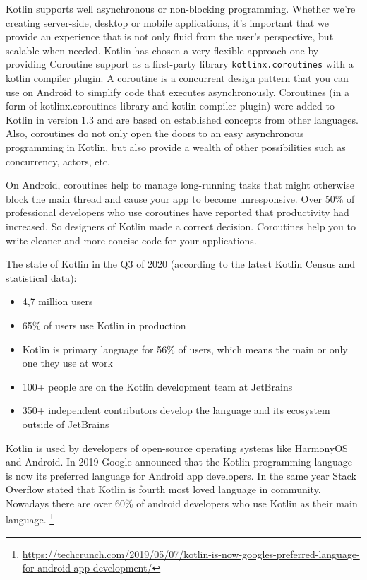 Kotlin supports well asynchronous or non-blocking programming. Whether we're creating server-side, desktop or mobile applications, it's important that we provide an experience that is not only fluid from the user's perspective, but scalable when needed. Kotlin has chosen a very flexible approach one by providing Coroutine support as a first-party library  \texttt{kotlinx.coroutines} with a kotlin compiler plugin. A coroutine is a concurrent design pattern that you can use on Android to simplify code that executes asynchronously. Coroutines (in a form of kotlinx.coroutines library and kotlin compiler plugin) were added to Kotlin in version 1.3 and are based on established concepts from other languages. Also, coroutines do not only open the doors to an easy asynchronous programming in Kotlin, but also provide a wealth of other possibilities such as concurrency, actors, etc.

On Android, coroutines help to manage long-running tasks that might otherwise block the main thread and cause your app to become unresponsive. Over 50\% of professional developers who use coroutines have reported that productivity had increased. So designers of Kotlin made a correct decision. Coroutines help you to write cleaner and more concise code for your applications.

The state of Kotlin in the Q3 of 2020 (according to the latest Kotlin Census and statistical data):
\begin{itemize}
    \item 4,7 million users
    \item 65\% of users use Kotlin in production
    \item Kotlin is primary language for 56\% of users, which means the main or only
    one they use at work
    \item 100+ people are on the Kotlin development team at JetBrains
    \item 350+ independent contributors develop the language and its ecosystem outside
    of JetBrains
\end{itemize}

Kotlin is used by developers of open-source operating systems like HarmonyOS and Android. In 2019 Google announced that the Kotlin programming language is now its preferred language for Android app developers. In the same year Stack Overflow stated that Kotlin is fourth most loved language in community. Nowadays there are over 60\% of android developers who use Kotlin as their main language. \footnote{\url{https://techcrunch.com/2019/05/07/kotlin-is-now-googles-preferred-language-for-android-app-development/}}

